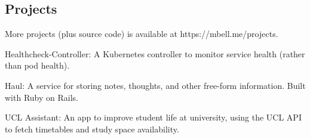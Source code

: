 \documentclass[11pt,a4paper]{article}
\newenvironment{indentsection}[1]%
{\begin{list}{}%
	{\setlength{\leftmargin}{#1}}%
	\item[]%
}
{\end{list}}
\begin{document}
\vspace{-1.2em}
\subsection*{Projects}
\begin{indentsection}{\parindent}
	More projects (plus source code) is available at https://mbell.me/projects.
	\begin{description*}
		\item[Healthcheck-Controller:] A Kubernetes controller to monitor service health (rather than pod health).
		\item[Haul:] A service for storing notes, thoughts, and other free-form information. Built with Ruby on Rails.
		\item[UCL Assistant:] An app to improve student life at university, using the UCL API to fetch timetables and study space availability.
	\end{description*}
\end{indentsection}
\end{document}
